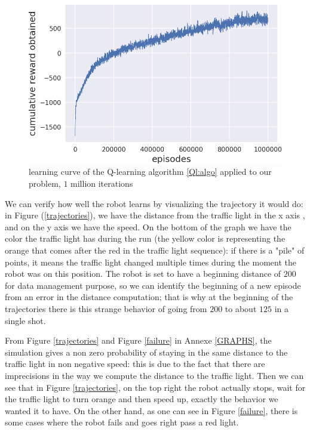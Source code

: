 \documentclass[14pt,a4paper]{article}
\theoremstyle{definition}
\begin{document}
\begin{figure}[h]
\centering
\captionsetup{justification=centering,margin=2cm}
\includegraphics[scale=0.6]{img/Q_learning_curve.png}
\caption{learning curve of the Q-learning algorithm \ref{Ql:algo} applied to our problem, $1$ million iterations}
\label{curve}
\end{figure}

We can verify how well the robot learns by visualizing the trajectory it would do: in Figure (\ref{trajectories}), we have the distance from the traffic light in the x axis , and on the y axis we have the speed. On the bottom of the graph we have the color the traffic light has during the run (the yellow color is representing the orange that comes after the red in the traffic light sequence): if there is a "pile" of points, it means the traffic light changed multiple times during the moment the robot was on this position. The robot is set to have a beginning distance of $200$ for data management purpose, so we can identify the beginning of a new episode from an error in the distance computation; that is why at the beginning of the trajectories there is this strange behavior of going from $200$ to about $125$ in a single shot.

From Figure \ref{trajectories} and Figure \ref{failure} in Annexe \ref{GRAPHS}, the simulation gives a non zero probability of staying in the same distance to the traffic light in non negative speed: this is due to the fact that there are imprecisions in the way we compute the distance to the traffic light. Then we can see that in Figure \ref{trajectories}, on the top right the robot actually stops, wait for the traffic light to turn orange and then speed up, exactly the behavior we wanted it to have. On the other hand, as one can see in Figure \ref{failure}, there is some cases where the robot fails and goes right pass a red light.
\end{document}
